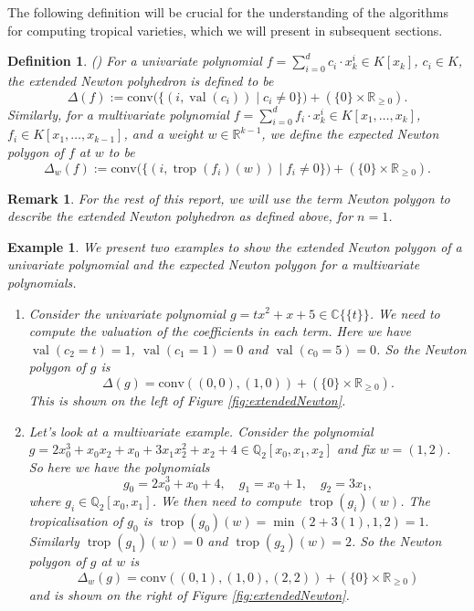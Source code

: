 \documentclass[11pt,reqno,a4paper]{article}
\theoremstyle{theoremstyle}
\theoremstyle{examplestyle}
\newtheorem{example}[theorem]{Example}
\newtheorem{definition}[theorem]{Definition}
\newtheorem{remark}[theorem]{Remark}
\theoremstyle{algorithmstyle}
\numberwithin{equation}{subsection}
\newcommand{\RR}{\mathbb{R}}
\newcommand{\QQ}{\mathbb{Q}}
\newcommand{\puiseux}{\mathbb{C}\{\{t\}\}}
\DeclareMathOperator{\trop}{trop}
\DeclareMathOperator{\val}{val}
\begin{document}
The following definition will be crucial for the understanding of the algorithms for computing tropical varieties, which we will present in subsequent sections.

\begin{definition}
    (\cite[Def. 2.6]{HR2018}) For a univariate polynomial $f=\sum_{i=0}^dc_i\cdot x_k^i \in K[x_k]$, $c_i \in K$, the \textit{extended Newton polyhedron} is defined to be \[\Delta(f) := \text{conv}\bigl(\{ (i,\val(c_i)) \; | \;  c_i \neq 0  \}\bigr) + (\{0\} \times \RR_{\geq0}).\] Similarly, for a multivariate polynomial $f=\sum_{i=0}^df_i\cdot x_k^i \in K[x_1,\ldots,x_k]$, $f_i \in K[x_1,\ldots,x_{k-1}]$, and a weight $w \in \RR^{k-1}$, we define the \textit{expected Newton polygon} of $f$ at $w$ to be \[\Delta_w(f):= \text{conv}\bigl( \{ (i, \trop(f_i)(w)) \; | \; f_i \neq 0 \}\bigr) + (\{0\} \times \RR_{\geq0}).\]
\end{definition}

\begin{remark}
    For the rest of this report, we will use the term Newton polygon to describe the extended Newton polyhedron as defined above, for $n = 1$.
\end{remark}

\begin{example}
    We present two examples to show the extended Newton polygon of a univariate polynomial and the expected Newton polygon for a multivariate polynomials. 
    \begin{enumerate}
        \item[(1)] Consider the univariate polynomial $g = tx^2 + x + 5 \in \puiseux$. We need to compute the valuation of the coefficients in each term. Here we have $\val(c_2 = t) = 1$, $\val(c_1 = 1) = 0$ and $\val(c_0 = 5) = 0$. So the Newton polygon of $g$ is \[\Delta(g) = \text{conv}((0,0), (1,0)) + (\{0\} \times \RR_{\geq0}).\] This is shown on the left of Figure \ref{fig:extendedNewton}.
        \item[(2)] Let's look at a multivariate example. Consider the polynomial \\$ g = 2x_0^3 + x_0x_2 + x_0 + 3x_1x_2^2 + x_2 + 4 \in \QQ_2[x_0,x_1,x_2]$ and fix $w = (1,2)$. So here we have the polynomials \[g_0 = 2x_0^3 + x_0 + 4, \quad g_1 = x_0 + 1, \quad g_2 = 3x_1,\] where $g_i \in \QQ_2[x_0,x_1]$. We then need to compute $\trop(g_i)(w)$. The tropicalisation of $g_0$ is $\trop(g_0)(w) = \min(2+3(1), 1, 2) = 1.$ Similarly $\trop(g_1)(w) = 0$ and $\trop(g_2)(w) = 2$. So the Newton polygon of $g$ at $w$ is \[\Delta_w(g) = \text{conv}((0,1), (1,0), (2,2)) + (\{0\} \times \RR_{\geq0})\] and is shown on the right of Figure \ref{fig:extendedNewton}. 
    \end{enumerate}
\end{example}
\end{document}
